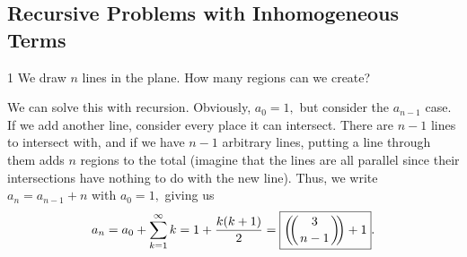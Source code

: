 
% 





% 



\noindent

\subsection{Recursive Problems with Inhomogeneous Terms}

\begin{problem}1
    We draw $n$ lines in the plane. How many regions can we create?
\end{problem}

\begin{solution}
    We can solve this with recursion. Obviously, $a_0=1,$ but consider the $a_{n-1}$ case. If we add another line, consider every place it can intersect. There are $n-1$ lines to intersect with, and if we have $n-1$ arbitrary lines, putting a line through them adds $n$ regions to the total (imagine that the lines are all parallel since their intersections have nothing to do with the new line). Thus, we write $a_n=a_{n-1}+n$ with $a_0=1,$ giving us $$a_n=a_0+\sum_{k=1}^{\infty}k=1+\frac{k (k+1)}{2}=\boxed{\multiset{3}{n-1}+1}.$$
\end{solution}

